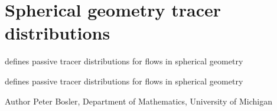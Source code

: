 \hypertarget{group__Tracers}{\section{Spherical geometry tracer distributions}
\label{group__Tracers}
}


defines passive tracer distributions for flows in spherical geometry  


defines passive tracer distributions for flows in spherical geometry 

\begin{DoxyAuthor}{Author}
Peter Bosler, Department of Mathematics, University of Michigan 
\end{DoxyAuthor}
